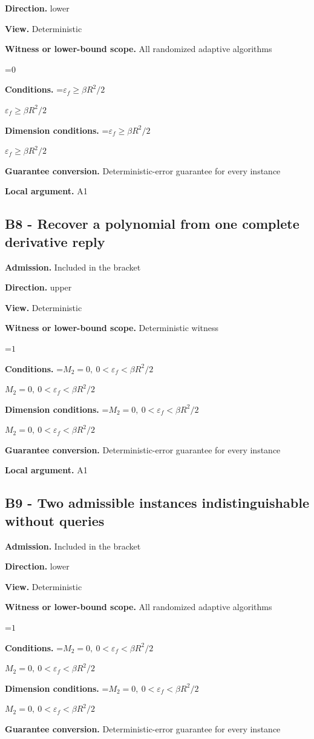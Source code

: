\documentclass[10pt,a4paper]{article}
\newcommand{\AtlasMath}[1]{\par\begingroup\centering\setbox0=\hbox{$\displaystyle #1$}\ifdim\wd0>1.4\linewidth\typeout{ATLAS WIDE FORMULA: \the\wd0}\fi\ifdim\wd0>\linewidth\resizebox{\linewidth}{!}{\box0}\else\box0\fi\par\endgroup}
\newcommand{\AtlasInlineMath}[1]{\begingroup\setbox0=\hbox{$#1$}\ifdim\wd0>.4\linewidth\endgroup\AtlasMath{#1}\else\endgroup$#1$\fi}
\begin{document}
\textbf{Direction.} lower

\textbf{View.} Deterministic

\textbf{Witness or lower-bound scope.} All randomized adaptive algorithms

\AtlasMath{0}
\textbf{Conditions.} \AtlasInlineMath{\varepsilon_f\ge\beta R^2/2}

\textbf{Dimension conditions.} \AtlasInlineMath{\varepsilon_f\ge\beta R^2/2}

\textbf{Guarantee conversion.} Deterministic-error guarantee for every instance

\textbf{Local argument.} A1

\subsection{B8 - Recover a polynomial from one complete derivative reply}
\textbf{Admission.} Included in the bracket

\textbf{Direction.} upper

\textbf{View.} Deterministic

\textbf{Witness or lower-bound scope.} Deterministic witness

\AtlasMath{1}
\textbf{Conditions.} \AtlasInlineMath{M_2=0,\ 0<\varepsilon_f<\beta R^2/2}

\textbf{Dimension conditions.} \AtlasInlineMath{M_2=0,\ 0<\varepsilon_f<\beta R^2/2}

\textbf{Guarantee conversion.} Deterministic-error guarantee for every instance

\textbf{Local argument.} A1

\subsection{B9 - Two admissible instances indistinguishable without queries}
\textbf{Admission.} Included in the bracket

\textbf{Direction.} lower

\textbf{View.} Deterministic

\textbf{Witness or lower-bound scope.} All randomized adaptive algorithms

\AtlasMath{1}
\textbf{Conditions.} \AtlasInlineMath{M_2=0,\ 0<\varepsilon_f<\beta R^2/2}

\textbf{Dimension conditions.} \AtlasInlineMath{M_2=0,\ 0<\varepsilon_f<\beta R^2/2}

\textbf{Guarantee conversion.} Deterministic-error guarantee for every instance
\end{document}
